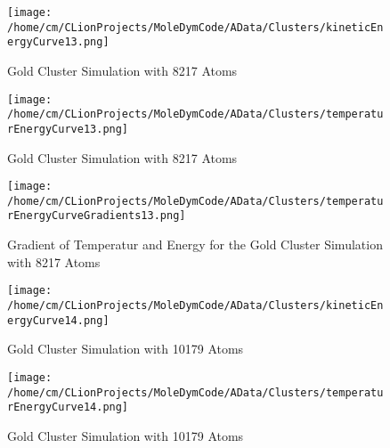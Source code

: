 \begin{figure}[!h] 
    \begin{center} 
        \texttt{[image: /home/cm/CLionProjects/MoleDymCode/AData/Clusters/kineticEnergyCurve13.png]} 
    \end{center} 
    \caption[Gold Cluster Simulation with 8217 Atoms]{Gold Cluster Simulation with 8217 Atoms} 
    \label{GoldClusterSimulationKineticTime8217} 
\end{figure} 
 
\begin{figure}[!h] 
    \begin{center} 
        \texttt{[image: /home/cm/CLionProjects/MoleDymCode/AData/Clusters/temperaturEnergyCurve13.png]} 
    \end{center} 
    \caption[Gold Cluster Simulation with 8217 Atoms]{Gold Cluster Simulation with 8217 Atoms} 
    \label{GoldClusterSimulationTemperaturEnergy8217} 
\end{figure} 
 
\begin{figure}[!h] 
    \begin{center} 
        \texttt{[image: /home/cm/CLionProjects/MoleDymCode/AData/Clusters/temperaturEnergyCurveGradients13.png]} 
    \end{center} 
    \caption[Gradient of Temperatur and Energy for the Gold Cluster Simulation with 8217 Atoms]{Gradient of Temperatur and Energy for the Gold Cluster Simulation with 8217 Atoms} 
    \label{GoldClusterSimulationGradient8217} 
\end{figure} 
 
\begin{figure}[!h] 
    \begin{center} 
        \texttt{[image: /home/cm/CLionProjects/MoleDymCode/AData/Clusters/kineticEnergyCurve14.png]} 
    \end{center} 
    \caption[Gold Cluster Simulation with 10179 Atoms]{Gold Cluster Simulation with 10179 Atoms} 
    \label{GoldClusterSimulationKineticTime10179} 
\end{figure} 
 
\begin{figure}[!h] 
    \begin{center} 
        \texttt{[image: /home/cm/CLionProjects/MoleDymCode/AData/Clusters/temperaturEnergyCurve14.png]} 
    \end{center} 
    \caption[Gold Cluster Simulation with 10179 Atoms]{Gold Cluster Simulation with 10179 Atoms} 
    \label{GoldClusterSimulationTemperaturEnergy10179} 
\end{figure} 
 
